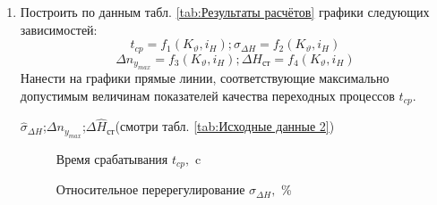 \begin{enumerate}
    \item Построить по данным табл. \ref{tab:Результаты расчётов} графики следующих зависимостей:
    $$t_{cp}=f_1(K_{\vartheta},i_H);\sigma_{\Delta H}=f_2(K_{\vartheta},i_H)$$
    $$\Delta n_{y_{max}}=f_3(K_{\vartheta},i_H);\Delta H_{\text{ст}}=f_4(K_{\vartheta},i_H)$$
    Нанести   на   графики   прямые   линии,   соответствующие   максимально допустимым величинам показателей качества переходных процессов  $t_{cp}$. 

    $\hat{\sigma}_{\Delta H}$;$\Delta n_{y_{max}}$;$\Delta \hat{H}_{\text{ст}}$(смотри табл. \ref{tab:Исходные данные 2})
    
    \begin{figure}[H]     %
        \caption{Время срабатывания $t_{cp},$ c}
        \label{fig:Время срабатывания}
    \end{figure}
    
    \begin{figure}[H]
        \caption{Относительное перерегулирование $\sigma_{\Delta H},$ \%}
        \label{fig:Относительное перерегулирование}
    \end{figure}
    

\end{enumerate}
